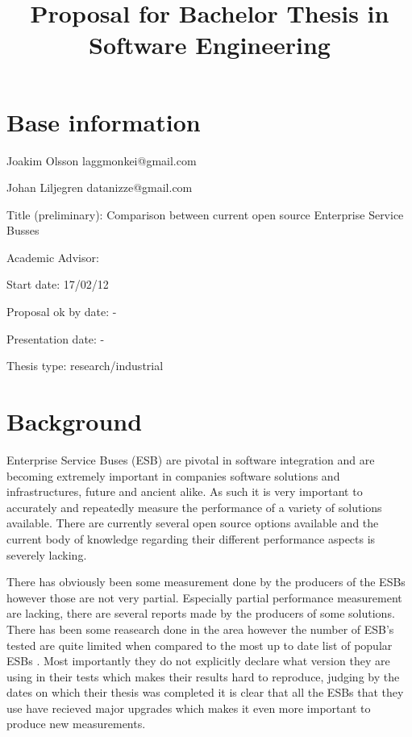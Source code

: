 \documentclass[10pt,a4paper]{proposal}
\title{Proposal for Bachelor Thesis in Software Engineering}
\begin{document}
\maketitle
\thispagestyle{fancy}


\section*{Base information}

Joakim Olsson laggmonkei@gmail.com

Johan Liljegren datanizze@gmail.com

Title (preliminary): Comparison between current open source Enterprise Service Busses

Academic Advisor:  

Start date: 17/02/12

Proposal ok by date: -

Presentation date: -


Thesis type: research\slash industrial


\section*{Background}


Enterprise Service Buses (ESB) \cite{falko07} are pivotal in software integration and are becoming extremely important in companies software solutions and  infrastructures, future and ancient alike. \cite{fenner03}
As such it is very important to accurately and repeatedly measure the performance of a variety of solutions available. 
There are currently several open source options available \cite{mehta11} and the current body of knowledge regarding their different performance aspects is severely lacking. 


There has obviously been some measurement done by the producers of the ESBs however those are not very partial. Especially partial performance measurement are lacking, there are several reports made by the producers of some solutions. \cite{Perera07,mulevsjboss,mulevsglassfish,mulevsservicemix,mulesoft08} There has been some reasearch done in the area \cite{ESBthesis} however the number of ESB's tested are quite limited when compared to the most up to date list of popular ESBs \cite{mehta11}. Most importantly they do not explicitly declare what version they are using in their tests which makes their results hard to reproduce, judging by the dates on which their thesis was completed it is clear that all the ESBs that they use have recieved major upgrades which makes it even more important to produce new measurements.
\end{document}
